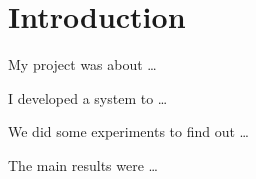 \section{Introduction}

My project was about \ldots

I developed a system to \ldots

We did some experiments to find out \ldots

The main results were \ldots

\pagebreak
